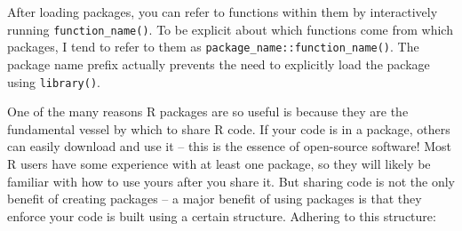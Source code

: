 \documentclass[
]{book}
\begin{document}
After loading packages, you can refer to functions within them by interactively running \texttt{function\_name()}. To be explicit about which functions come from which packages, I tend to refer to them as \texttt{package\_name::function\_name()}. The package name prefix actually prevents the need to explicitly load the package using \texttt{library()}.

One of the many reasons R packages are so useful is because they are the fundamental vessel by which to share R code. If your code is in a package, others can easily download and use it -- this is the essence of open-source software! Most R users have some experience with at least one package, so they will likely be familiar with how to use yours after you share it. But sharing code is not the only benefit of creating packages -- a major benefit of using packages is that they enforce your code is built using a certain structure. Adhering to this structure:
\end{document}
